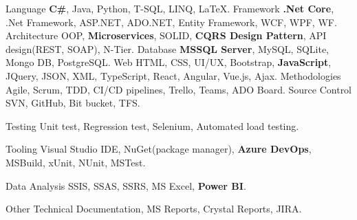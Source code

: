 \begin{cvskills}
  \cvskill
    { Language } %
    {{\bf C\#}, Java, Python, T-SQL, LINQ, LaTeX.}
  \cvskill
    { Framework} %
    { {\bf .Net Core}, .Net Framework, ASP.NET, ADO.NET, Entity Framework, WCF, WPF, WF.}
  \cvskill
    { Architecture} %
    { OOP, {\bf Microservices}, SOLID, {\bf CQRS Design Pattern}, API design(REST, SOAP), N-Tier.}
  \cvskill
    { Database} %
    { {\bf MSSQL Server}, MySQL, SQLite, Mongo DB, PostgreSQL.}
  \cvskill
    { Web } %
    { HTML, CSS, UI/UX, Bootstrap, {\bf JavaScript}, JQuery, JSON, XML, TypeScript, React, Angular, Vue.js, Ajax.}
  \cvskill
    { Methodologies} %
    { Agile, Scrum, TDD, CI/CD pipelines, Trello, Teams, ADO Board.}
  \cvskill
    { Source Control} %
    { SVN, GitHub, Bit bucket, TFS.}
  
  \cvskill
    {Testing} %
    { Unit test, Regression test, Selenium, Automated load testing.}

  \cvskill
    {Tooling} %
    { Visual Studio IDE, NuGet(package manager), {\bf  Azure DevOps}, MSBuild, xUnit, NUnit, MSTest.}

  \cvskill
    { Data Analysis} %
    { SSIS, SSAS, SSRS, MS Excel, {\bf Power BI}.}

  \cvskill
    { Other} %
    { Technical Documentation, MS Reports, Crystal Reports, JIRA.}

\end{cvskills}
